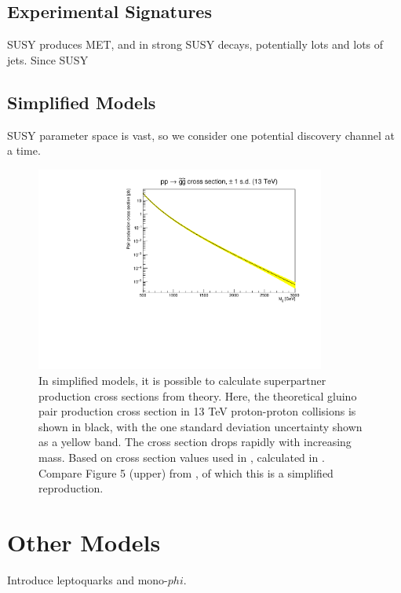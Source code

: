   \subsection{Experimental Signatures} \label{sec:SUSYexp}

  SUSY produces MET, and in strong SUSY decays, potentially lots and lots of jets.
  Since SUSY

  \subsection{Simplified Models} \label{sec:SUSYsms}

  SUSY parameter space is vast, so we consider one potential discovery channel at a time.

  \begin{figure}[h!]
    \centering
    \includegraphics[width=0.85\textwidth]{figures/gluino_xsec.pdf}
    \caption[Theoretical gluino pair production cross section in simplified models.]{In simplified models, it is possible to calculate superpartner production cross sections from theory.
Here, the theoretical gluino pair production cross section in 13 TeV proton-proton collisions is shown in black, with the one standard deviation uncertainty shown as a yellow band.
The cross section drops rapidly with increasing mass.
Based on cross section values used in \cite{MT2_2019}, calculated in \cite{SUSYxsecs}.
Compare Figure 5 (upper) from \cite{SUSYxsecs}, of which this is a simplified reproduction.
}
    \label{fig:SUSYxsec}
  \end{figure}  

\section{Other Models} \label{sec:othermodels}

Introduce leptoquarks and mono-$phi$.

